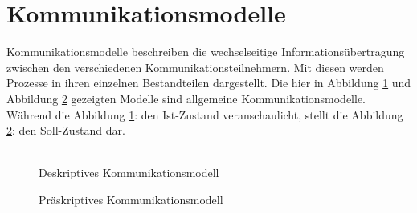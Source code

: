 \section{Kommunikationsmodelle}
Kommunikationsmodelle beschreiben die wechselseitige Informationsübertragung zwischen den verschiedenen Kommunikationsteilnehmern. Mit diesen werden Prozesse in ihren einzelnen Bestandteilen dargestellt. Die hier in Abbildung \ref{img:deskriptiv} und Abbildung \ref{img:präskriptiv} gezeigten Modelle sind allgemeine Kommunikationsmodelle. Während die Abbildung \ref{img:deskriptiv}: \glqq {}\grqq{} den Ist-Zustand veranschaulicht, stellt die Abbildung \ref{img:präskriptiv}: \glqq {}\grqq{} den Soll-Zustand dar.\\\\
\begin{figure}[H]
	\centering
	\setlength{\fboxsep}{1pt}
	\setlength{\fboxrule}{1pt}
	\captionsetup{justification=centering}
	\caption{Deskriptives Kommunikationsmodell}
	\label{img:deskriptiv}
\end{figure}
\begin{figure}[H]
	\centering
	\setlength{\fboxsep}{1pt}
	\setlength{\fboxrule}{1pt}
	\captionsetup{justification=centering}
	\caption{Präskriptives Kommunikationsmodell}
	\label{img:präskriptiv}
\end{figure}